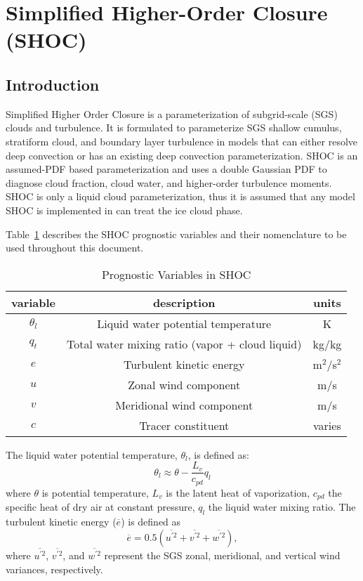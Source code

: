\section{Simplified Higher-Order Closure (SHOC)}

\subsection{Introduction}

Simplified Higher Order Closure \citep[SHOC;][]{Bogenschutz_Krueger13} is a parameterization of subgrid-scale (SGS) clouds and turbulence.  It is formulated to parameterize SGS shallow cumulus, stratiform cloud, and boundary layer turbulence in models that can either resolve deep convection or has an existing deep convection parameterization.  SHOC is an assumed-PDF based parameterization and uses a double Gaussian PDF to diagnose cloud fraction, cloud water, and higher-order turbulence moments.  SHOC is only a liquid cloud parameterization, thus it is assumed that any model SHOC is implemented in can treat the ice cloud phase. 

Table~\ref{table:prognostic} describes the SHOC prognostic variables and their nomenclature to be used throughout this document.  

\begin{table}[b]
\caption{Prognostic Variables in SHOC}
\centering
\begin{tabular}{c c c}
\hline\hline
variable & description & units \\
\hline
$\theta_{l}$ & Liquid water potential temperature & K \\
$q_{t}$ & Total water mixing ratio (vapor + cloud liquid) & kg/kg \\
$e$ & Turbulent kinetic energy & m$^2$/s$^2$ \\
$u$ & Zonal wind component & m/s \\
$v$ & Meridional wind component & m/s \\
$c$ & Tracer constituent & varies \\
\hline
\end{tabular}
\label{table:prognostic}
\end{table}

The liquid water potential temperature, $\theta_{l}$, is defined as:
%
\begin{equation}
  \theta_{l} \approx \theta - \frac{L_{v}}{c_{pd}}q_{l}
  \label{thetal}
\end{equation}
%
where $\theta$ is potential temperature, $L_{v}$ is the latent heat of vaporization, $c_{pd}$ the specific heat of dry air at constant pressure, $q_{l}$ the liquid water mixing ratio.  The turbulent kinetic energy ($\overline{e}$) is defined as
%
\begin{equation}
  \overline{e} = 0.5(\overline{u^{'2}}+\overline{v^{'2}}+\overline{w^{'2}}) , 
  \label{tke}
\end{equation}  
%
where $\overline{u^{'2}}$, $\overline{v^{'2}}$, and $\overline{w^{'2}}$ represent the SGS zonal, meridional, and vertical wind variances, respectively.  

